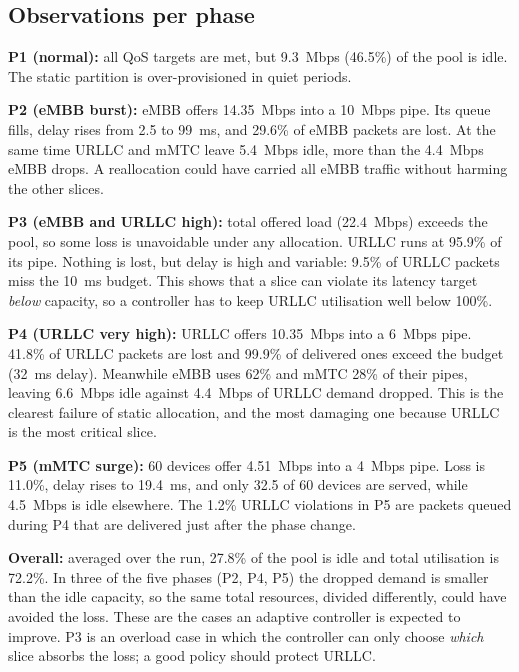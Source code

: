 \documentclass[conference]{IEEEtran}
\begin{document}
\subsection{Observations per phase}
\textbf{P1 (normal):} all QoS targets are met, but 9.3~Mbps (46.5\%) of the pool is idle. The static partition is over-provisioned in quiet periods.

\textbf{P2 (eMBB burst):} eMBB offers 14.35~Mbps into a 10~Mbps pipe. Its queue fills, delay rises from 2.5 to 99~ms, and 29.6\% of eMBB packets are lost. At the same time URLLC and mMTC leave 5.4~Mbps idle, more than the 4.4~Mbps eMBB drops. A reallocation could have carried all eMBB traffic without harming the other slices.

\textbf{P3 (eMBB and URLLC high):} total offered load (22.4~Mbps) exceeds the pool, so some loss is unavoidable under any allocation. URLLC runs at 95.9\% of its pipe. Nothing is lost, but delay is high and variable: 9.5\% of URLLC packets miss the 10~ms budget. This shows that a slice can violate its latency target \emph{below} capacity, so a controller has to keep URLLC utilisation well below 100\%.

\textbf{P4 (URLLC very high):} URLLC offers 10.35~Mbps into a 6~Mbps pipe. 41.8\% of URLLC packets are lost and 99.9\% of delivered ones exceed the budget (32~ms delay). Meanwhile eMBB uses 62\% and mMTC 28\% of their pipes, leaving 6.6~Mbps idle against 4.4~Mbps of URLLC demand dropped. This is the clearest failure of static allocation, and the most damaging one because URLLC is the most critical slice.

\textbf{P5 (mMTC surge):} 60 devices offer 4.51~Mbps into a 4~Mbps pipe. Loss is 11.0\%, delay rises to 19.4~ms, and only 32.5 of 60 devices are served, while 4.5~Mbps is idle elsewhere. The 1.2\% URLLC violations in P5 are packets queued during P4 that are delivered just after the phase change.

\textbf{Overall:} averaged over the run, 27.8\% of the pool is idle and total utilisation is 72.2\%. In three of the five phases (P2, P4, P5) the dropped demand is smaller than the idle capacity, so the same total resources, divided differently, could have avoided the loss. These are the cases an adaptive controller is expected to improve. P3 is an overload case in which the controller can only choose \emph{which} slice absorbs the loss; a good policy should protect URLLC.

\end{document}
